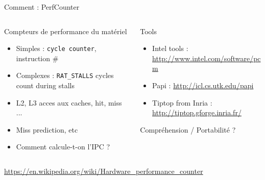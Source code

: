 %
\begin{Frame}{Comment : PerfCounter}
  \begin{columns}[t]
    \begin{column}{\BW} %
      \begin{block}{Compteurs de performance du matériel}
        \begin{itemize}
        \item Simples : \texttt{cycle counter}, instruction \#
        \item Complexes : \texttt{RAT\_STALLS} cycles count during stalls
        \item L2, L3 acces aux caches, hit, miss ...
        \item Miss prediction, etc
        \end{itemize}
      \end{block} 
      \begin{alertblock}{}
        \begin{itemize}
        \item Comment calcule-t-on l'IPC ?
        \end{itemize}
      \end{alertblock}
    \end{column}
    
    \begin{column}{\BW} %
      \begin{block}{Tools}
        \begin{itemize}
        \item Intel tools : \url{http://www.intel.com/software/pcm}
        \item Papi : \url{http://icl.cs.utk.edu/papi}
        \item Tiptop from Inria : \url{http://tiptop.gforge.inria.fr/}
        \end{itemize}
      \end{block}   
      \begin{alertblock}{}
        Compréhension /  Portabilité ?
      \end{alertblock}   
    \end{column}
  \end{columns}  
\url{https://en.wikipedia.org/wiki/Hardware_performance_counter}
\end{Frame}


